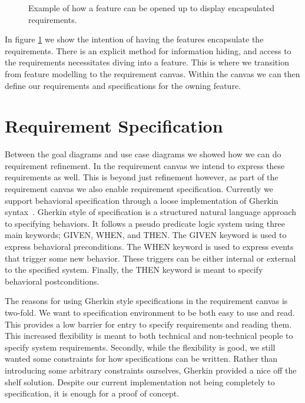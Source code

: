\begin{figure}
	\centering
	
	\caption{Example of how a feature can be opened up to display encapsulated requirements.}
	\label{fig:feature-requirement}
\end{figure}

In figure \ref{fig:feature-requirement} we show the intention of having the features encapsulate the requirements. There is an explicit method for information hiding, and access to the requirements necessitates diving into a feature. This is where we transition from feature modelling to the requirement canvas. Within the canvas we can then define our requirements and specifications for the owning feature. 

\section{Requirement Specification}

Between the goal diagrams and use case diagrams we showed how we can do requirement refinement. In the requirement canvas we intend to express these requirements as well. This is beyond just refinement however, as part of the requirement canvas we also enable requirement specification. Currently we support behavioral specification through a loose implementation of Gherkin syntax~\cite{cucumberdocs}. Gherkin style of specification is a structured natural language approach to specifying behaviors. It follows a pseudo predicate logic system using three main keywords; GIVEN, WHEN, and THEN. The GIVEN keyword is used to express behavioral preconditions. The WHEN keyword is used to express events that trigger some new behavior. These triggers can be either internal or external to the specified system. Finally, the THEN keyword is meant to specify behavioral postconditions. 

The reasons for using Gherkin style specifications in the requirement canvas is two-fold. We want to specification environment to be both easy to use and read. This provides a low barrier for entry to specify requirements and reading them. This increased flexibility is meant to both technical and non-technical people to specify system requirements. Secondly, while the flexibility is good, we still wanted some constraints for how specifications can be written. Rather than introducing some arbitrary constraints ourselves, Gherkin provided a nice off the shelf solution. Despite our current implementation not being completely to specification, it is enough for a proof of concept.

